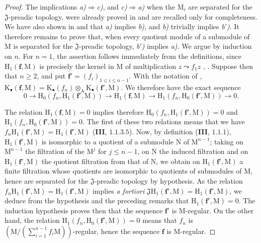 \begin{proof}
The implications \emph{a)}$\Rightarrow$\emph{c)}, and \emph{c)}$\Rightarrow$\emph{a)} when the $\mathrm{M}_i$ are separated for the $\mathfrak{J}$-preadic topology, were already proved in  and are recalled only for completeness.
We have also shown in  and  that \emph{a)} implies \emph{b)}, and \emph{b)} trivially implies \emph{b$'$)}.
It therefore remains to prove that, when every quotient module of a submodule of $\mathrm{M}$ is separated for the $\mathfrak{J}$-preadic topology, \emph{b$'$)} implies \emph{a)}.
We argue by induction on $n$.
For $n=1$, the assertion follows immediately from the definitions, since $\mathrm{H}_1(\mathbf{f},\mathrm{M})$ is precisely the kernel in $\mathrm{M}$ of multiplication $z\leadsto f_1z$ , .
Suppose then that $n\geq2$, and put $\mathbf{f}'=(f_i)_{1\leq i\leq n-1}$.
With the notation of ,
$\mathrm{K}_\bullet(\mathbf{f},\mathrm{M})=\mathrm{K}_\bullet(f_n)\otimes_\mathrm{A}\mathrm{K}_\bullet(\mathbf{f}',\mathrm{M})$.
We therefore have  the exact sequence
\[
  0\longrightarrow\mathrm{H}_0(f_n,\mathrm{H}_1(\mathbf{f}',\mathrm{M}))
  \longrightarrow\mathrm{H}_1(\mathbf{f},\mathrm{M})
  \longrightarrow\mathrm{H}_1(f_n,\mathrm{H}_0(\mathbf{f}',\mathrm{M}))
  \longrightarrow0.
  \tag{19.5.1.1}\label{IV.19.5.1.1}
\]


The relation $\mathrm{H}_1(\mathbf{f},\mathrm{M})=0$ implies therefore $\mathrm{H}_0(f_n,\mathrm{H}_1(\mathbf{f}',\mathrm{M}))=0$ and $\mathrm{H}_1(f_n,\mathrm{H}_0(\mathbf{f}',\mathrm{M}))=0$.
The first of these two relations means that we have $f_n\mathrm{H}_1(\mathbf{f}',\mathrm{M})=\mathrm{H}_1(\mathbf{f}',\mathrm{M})$ \quad (\textbf{III},
$1.1.3.5$). Now, by definition (\textbf{III}, $1.1.1$), $\mathrm{H}_1(\mathbf{f}',\mathrm{M})$ is isomorphic to a quotient of a submodule $\mathrm{N}$ of $\mathrm{M}^{n-1}$; taking on $\mathrm{M}^{n-1}$ the filtration of the $\mathrm{M}^j$ for $j\leqslant n-1$, on $\mathrm{N}$ the induced filtration and on $\mathrm{H}_1(\mathbf{f}',\mathrm{M})$ the quotient filtration from that of $\mathrm{N}$, we obtain on $\mathrm{H}_1(\mathbf{f}',\mathrm{M})$ a finite filtration whose quotients are isomorphic to quotients of submodules of $\mathrm{M}$, hence are separated for the $\mathfrak{J}$-preadic topology by hypothesis.
As the relation $f_n\mathrm{H}_1(\mathbf{f}',\mathrm{M})=\mathrm{H}_1(\mathbf{f}',\mathrm{M})$ implies \emph{a fortiori} $\mathfrak{J}\mathrm{H}_1(\mathbf{f}',\mathrm{M})=\mathrm{H}_1(\mathbf{f}',\mathrm{M})$,
we deduce from the hypothesis and the preceding remarks that $\mathrm{H}_1(\mathbf{f}',\mathrm{M})=0$. The induction hypothesis proves then that the sequence $\mathbf{f}'$ is M-regular. On the other hand, the relation
$\mathrm{H}_1(f_n,\mathrm{H}_0(\mathbf{f}',\mathrm{M}))=0$ means that $f_n$ is $(\mathrm{M}/(\sum_{i=1}^{n-1}f_i\mathrm{M}))$-regular, hence the sequence $\mathbf{f}$ is M-regular.
\end{proof}


